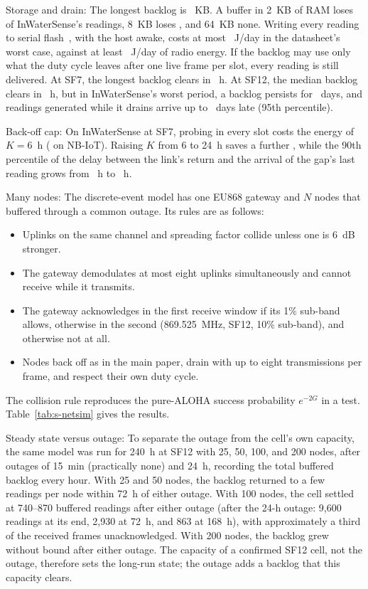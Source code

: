 \documentclass[journal]{IEEEtran}
\begin{document}
Storage and drain: The longest backlog is \maxBufferKB~KB. A buffer in 2~KB of RAM loses \ramLossTwo{} of InWaterSense's readings, 8~KB loses \ramLossEight, and 64~KB none. Writing every reading to serial flash~\cite{winbond2018w25q128jv}, with the host awake, costs at most \flashJDayMax~J/day in the datasheet's worst case, against at least \radioJDayMin~J/day of radio energy. If the backlog may use only what the duty cycle leaves after one live frame per slot, every reading is still delivered. At SF7, the longest backlog clears in \drainSevenMaxH~h. At SF12, the median backlog clears in \drainTwelveMedH~h, but in InWaterSense's worst period, a backlog persists for \drainTwelveMaxD~days, and readings generated while it drains arrive up to \drainTwelveLiveP~days late (95th percentile).

Back-off cap: On InWaterSense at SF7, probing in every slot costs \kEverySlotSeven{} the energy of $K=6$~h (\kEverySlotNb{} on NB-IoT). Raising $K$ from 6 to 24~h saves a further \kSixToDaySave, while the 90th percentile of the delay between the link's return and the arrival of the gap's last reading grows from \kPninetySix~h to \kPninetyDay~h.

Many nodes: The discrete-event model has one EU868 gateway and $N$ nodes that buffered through a common outage. Its rules are as follows:
\begin{itemize}
\item Uplinks on the same channel and spreading factor collide unless one is 6~dB stronger.
\item The gateway demodulates at most eight uplinks simultaneously and cannot receive while it transmits.
\item The gateway acknowledges in the first receive window if its 1\% sub-band allows, otherwise in the second (869.525~MHz, SF12, 10\% sub-band), and otherwise not at all.
\item Nodes back off as in the main paper, drain with up to eight transmissions per frame, and respect their own duty cycle.
\end{itemize}
The collision rule reproduces the pure-ALOHA success probability $e^{-2G}$ in a test. Table~\ref{tab:s-netsim} gives the results.

Steady state versus outage: To separate the outage from the cell's own capacity, the same model was run for 240~h at SF12 with 25, 50, 100, and 200 nodes, after outages of 15~min (practically none) and 24~h, recording the total buffered backlog every hour. With 25 and 50 nodes, the backlog returned to a few readings per node within 72~h of either outage. With 100 nodes, the cell settled at 740--870 buffered readings after either outage (after the 24-h outage: 9,600 readings at its end, 2,930 at 72~h, and 863 at 168~h), with approximately a third of the received frames unacknowledged. With 200 nodes, the backlog grew without bound after either outage. The capacity of a confirmed SF12 cell, not the outage, therefore sets the long-run state; the outage adds a backlog that this capacity clears.
\end{document}
